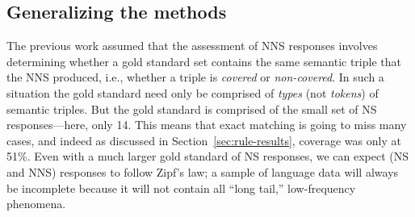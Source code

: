 %
%
%

\subsection{Generalizing the methods}
\label{sec:ranking}

The previous work assumed that the assessment of NNS responses
involves determining whether a gold standard set contains the same
semantic triple that the NNS produced, i.e., whether a triple
is \textit{covered} or \textit{non-covered}.  In such a situation the
gold standard need only be comprised of \textit{types} (not \textit{tokens}) of semantic triples. But the gold standard is comprised of the small set of NS responses---here, only 14. This means that exact matching is going to miss many cases,
and indeed as discussed in Section~\ref{sec:rule-results}, coverage was only at 51\%. Even with a much larger gold standard of NS responses, we can expect (NS and NNS) responses to follow Zipf's law; a sample of language data will always be incomplete because it will not contain all ``long tail,'' low-frequency phenomena.

